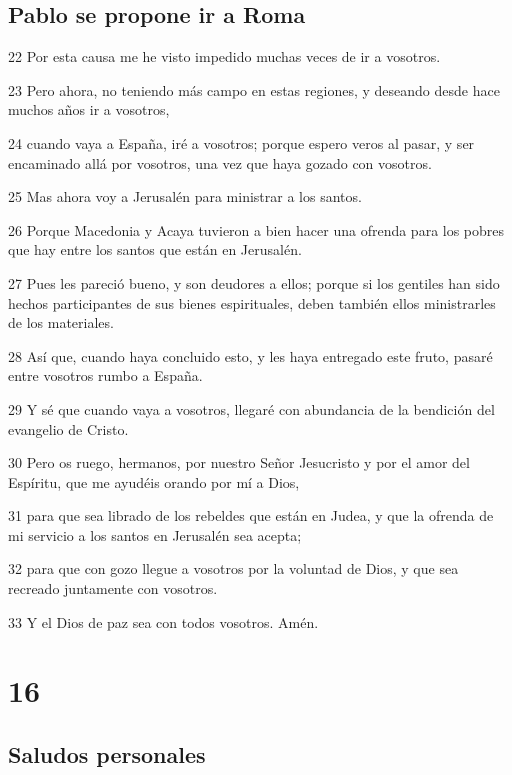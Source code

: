\section*{Pablo se propone ir a Roma}

\par 22 Por esta causa me he visto impedido muchas veces de ir a vosotros.
\par 23 Pero ahora, no teniendo más campo en estas regiones, y deseando desde hace muchos años ir a vosotros,
\par 24 cuando vaya a España, iré a vosotros; porque espero veros al pasar, y ser encaminado allá por vosotros, una vez que haya gozado con vosotros.
\par 25 Mas ahora voy a Jerusalén para ministrar a los santos.
\par 26 Porque Macedonia y Acaya tuvieron a bien hacer una ofrenda para los pobres que hay entre los santos que están en Jerusalén.
\par 27 Pues les pareció bueno, y son deudores a ellos; porque si los gentiles han sido hechos participantes de sus bienes espirituales, deben también ellos ministrarles de los materiales.
\par 28 Así que, cuando haya concluido esto, y les haya entregado este fruto, pasaré entre vosotros rumbo a España.
\par 29 Y sé que cuando vaya a vosotros, llegaré con abundancia de la bendición del evangelio de Cristo.
\par 30 Pero os ruego, hermanos, por nuestro Señor Jesucristo y por el amor del Espíritu, que me ayudéis orando por mí a Dios,
\par 31 para que sea librado de los rebeldes que están en Judea, y que la ofrenda de mi servicio a los santos en Jerusalén sea acepta;
\par 32 para que con gozo llegue a vosotros por la voluntad de Dios, y que sea recreado juntamente con vosotros.
\par 33 Y el Dios de paz sea con todos vosotros. Amén.

\chapter{16}

\section*{Saludos personales}


